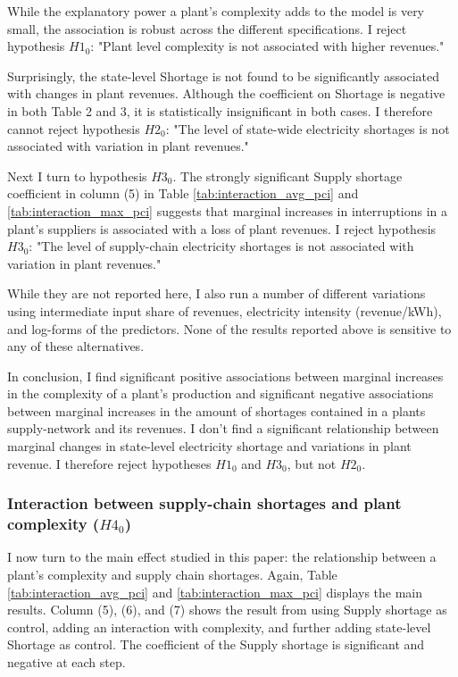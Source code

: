 \documentclass[11pt]{article}
\begin{document}
While the explanatory power a plant's complexity adds to the model is very small, the association is robust across the different specifications. I reject hypothesis $H1_0$: "Plant level complexity is not associated with higher revenues."

Surprisingly, the state-level Shortage is not found to be significantly associated with changes in plant revenues. Although the coefficient on Shortage is negative in both Table 2 and 3, it is statistically insignificant in both cases. I therefore cannot reject hypothesis $H2_0$: "The level of state-wide electricity shortages is not associated with variation in plant revenues." 

Next I turn to hypothesis $H3_0$. The strongly significant Supply shortage coefficient in column (5) in Table \ref{tab:interaction_avg_pci} and \ref{tab:interaction_max_pci} suggests that marginal increases in interruptions in a plant's suppliers is associated with a loss of plant revenues. I reject hypothesis $H3_0$: "The level of supply-chain electricity shortages is not associated with variation in plant revenues." 

While they are not reported here, I also run a number of different variations using intermediate input share of revenues, electricity intensity (revenue/kWh), and log-forms of the predictors. None of the results reported above is sensitive to any of these alternatives.

In conclusion, I find significant positive associations between marginal increases in the complexity of a plant's production and significant negative associations between marginal increases in the amount of shortages contained in a plants supply-network and its revenues. I don't find a significant relationship between marginal changes in state-level electricity shortage and variations in plant revenue. I therefore reject hypotheses $H1_0$ and $H3_0$, but not $H2_0$.

\subsubsection{Interaction between supply-chain shortages and plant complexity ($H4_0$)}
\label{sub:h4}
I now turn to the main effect studied in this paper: the relationship between a plant's complexity and supply chain shortages. Again, Table \ref{tab:interaction_avg_pci} and \ref{tab:interaction_max_pci} displays the main results. Column (5), (6), and (7) shows the result from using Supply shortage as control, adding an interaction with complexity, and further adding state-level Shortage as control. The coefficient of the Supply shortage is significant and negative at each step. 
\end{document}
